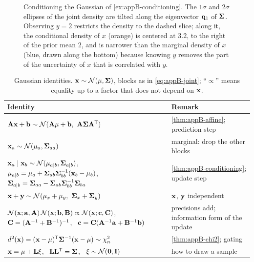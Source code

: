 \begin{figure}[tb]
  \centering
  \caption{Conditioning the Gaussian of \cref{ex:appB-conditioning}. The $1\sigma$ and $2\sigma$ ellipses of the joint density are tilted along the eigenvector $\mathbf{q}_1$ of $\mathbf{\Sigma}$. Observing $y = 2$ restricts the density to the dashed slice; along it, the conditional density of $x$ (orange) is centered at $3.2$, to the right of the prior mean $2$, and is narrower than the marginal density of $x$ (blue, drawn along the bottom) because knowing $y$ removes the part of the uncertainty of $x$ that is correlated with $y$.}
  \label{fig:appB-conditioning}
\end{figure}

\begin{table}[tb]
  \centering\small
  \caption{Gaussian identities. $\state \sim \Normal(\vect{\mu}, \mat{\Sigma})$, blocks as in \cref{eq:appB-joint}; ``$\propto$'' means equality up to a factor that does not depend on $\state$.}
  \label{tab:appB-gaussian}
  \begin{tabular}{@{}L{9.0cm}L{5.8cm}@{}}
  \toprule
  Identity & Remark\\
  \midrule
  $\mat{A}\state + \vect{b} \sim \Normal(\mat{A}\vect{\mu} + \vect{b},\ \mat{A}\mat{\Sigma}\mat{A}\T)$ & \cref{thm:appB-affine}; prediction step\\
  $\mathbf{x}_a \sim \mathcal{N}(\mathbf{\mu}_a, \mathbf{\Sigma}_{aa})$ & marginal: drop the other blocks\\
  $\mathbf{x}_a \mid \mathbf{x}_b \sim \mathcal{N}(\mathbf{\mu}_{a|b}, \mathbf{\Sigma}_{a|b})$, \ $\mathbf{\mu}_{a|b} = \mathbf{\mu}_a + \mathbf{\Sigma}_{ab}\mathbf{\Sigma}_{bb}^{-1}(\mathbf{x}_b - \mathbf{\mu}_b)$, \ $\mathbf{\Sigma}_{a|b} = \mathbf{\Sigma}_{aa} - \mathbf{\Sigma}_{ab}\mathbf{\Sigma}_{bb}^{-1}\mathbf{\Sigma}_{ba}$ & \cref{thm:appB-conditioning}; update step\\
  $\mathbf{x} + \mathbf{y} \sim \mathcal{N}(\mathbf{\mu}_x + \mathbf{\mu}_y,\ \mathbf{\Sigma}_x + \mathbf{\Sigma}_y)$ & $\state$, $\mathbf{y}$ independent\\
  $\mathcal{N}(\mathbf{x}; \mathbf{a}, \mathbf{A})\,\mathcal{N}(\mathbf{x}; \mathbf{b}, \mathbf{B}) \propto \mathcal{N}(\mathbf{x}; \mathbf{c}, \mathbf{C})$, \ $\mathbf{C} = (\mathbf{A}^{-1} + \mathbf{B}^{-1})^{-1}$, \ $\mathbf{c} = \mathbf{C}(\mathbf{A}^{-1}\mathbf{a} + \mathbf{B}^{-1}\mathbf{b})$ & precisions add; information form of the update\\
  $d^2(\mathbf{x}) = (\mathbf{x} - \mathbf{\mu})^{\mathsf{T}}\mathbf{\Sigma}^{-1}(\mathbf{x} - \mathbf{\mu}) \sim \chi^2_n$ & \cref{thm:appB-chi2}; gating\\
  $\mathbf{x} = \mathbf{\mu} + \mathbf{L}\mathbf{\xi}$, \ $\mathbf{L}\mathbf{L}^{\mathsf{T}} = \mathbf{\Sigma}$, \ $\mathbf{\xi} \sim \mathcal{N}(\mathbf{0}, \mathbf{I})$ & how to draw a sample\\
  \bottomrule
  \end{tabular}
\end{table}

